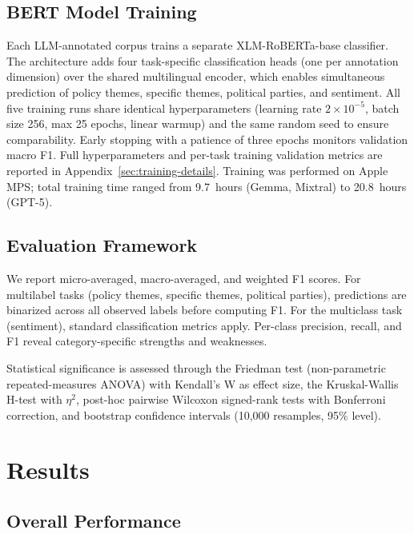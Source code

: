 \documentclass[12pt]{article}
\begin{document}
\subsection{BERT Model Training}

Each LLM-annotated corpus trains a separate XLM-RoBERTa-base classifier. The architecture adds four task-specific classification heads (one per annotation dimension) over the shared multilingual encoder, which enables simultaneous prediction of policy themes, specific themes, political parties, and sentiment. All five training runs share identical hyperparameters (learning rate $2 \times 10^{-5}$, batch size 256, max 25 epochs, linear warmup) and the same random seed to ensure comparability. Early stopping with a patience of three epochs monitors validation macro F1. Full hyperparameters and per-task training validation metrics are reported in Appendix~\ref{sec:training-details}. Training was performed on Apple MPS; total training time ranged from 9.7~hours (Gemma, Mixtral) to 20.8~hours (GPT-5).

\subsection{Evaluation Framework}

We report micro-averaged, macro-averaged, and weighted F1 scores. For multilabel tasks (policy themes, specific themes, political parties), predictions are binarized across all observed labels before computing F1. For the multiclass task (sentiment), standard classification metrics apply. Per-class precision, recall, and F1 reveal category-specific strengths and weaknesses.

Statistical significance is assessed through the Friedman test (non-parametric repeated-measures ANOVA) with Kendall’s W as effect size, the Kruskal-Wallis H-test with $\eta^2$, post-hoc pairwise Wilcoxon signed-rank tests with Bonferroni correction, and bootstrap confidence intervals (10,000 resamples, 95\% level).

\newpage
\section{Results}

\subsection{Overall Performance}
\end{document}
